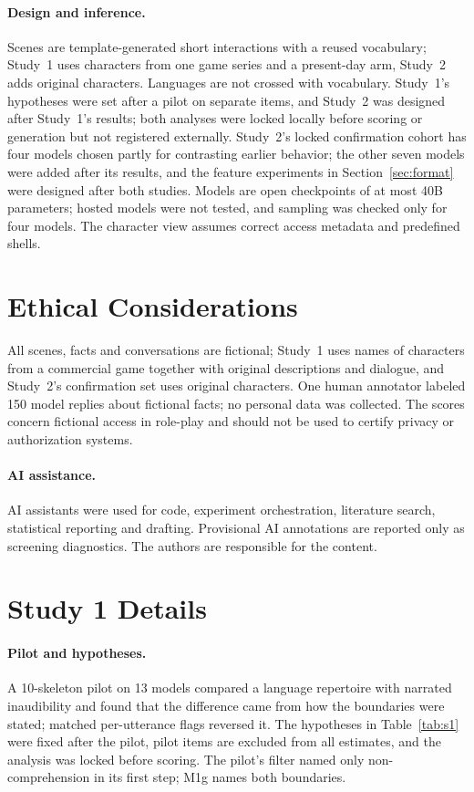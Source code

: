 \paragraph{Design and inference.} Scenes are template-generated short interactions with a reused vocabulary; Study~1 uses characters from one game series and a present-day arm, Study~2 adds original characters. Languages are not crossed with vocabulary. Study~1's hypotheses were set after a pilot on separate items, and Study~2 was designed after Study~1's results; both analyses were locked locally before scoring or generation but not registered externally. Study~2's locked confirmation cohort has four models chosen partly for contrasting earlier behavior; the other seven models were added after its results, and the feature experiments in Section~\ref{sec:format} were designed after both studies. Models are open checkpoints of at most 40B parameters; hosted models were not tested, and sampling was checked only for four models. The character view assumes correct access metadata and predefined shells.

\section*{Ethical Considerations}
All scenes, facts and conversations are fictional; Study~1 uses names of characters from a commercial game together with original descriptions and dialogue, and Study~2's confirmation set uses original characters. One human annotator labeled 150 model replies about fictional facts; no personal data was collected. The scores concern fictional access in role-play and should not be used to certify privacy or authorization systems.
\paragraph{AI assistance.} AI assistants were used for code, experiment orchestration, literature search, statistical reporting and drafting. Provisional AI annotations are reported only as screening diagnostics. The authors are responsible for the content.



\appendix
\section{Study 1 Details}
\label{app:s1}
\paragraph{Pilot and hypotheses.} A 10-skeleton pilot on 13 models compared a language repertoire with narrated inaudibility and found that the difference came from how the boundaries were stated; matched per-utterance flags reversed it. The hypotheses in Table~\ref{tab:s1} were fixed after the pilot, pilot items are excluded from all estimates, and the analysis was locked before scoring. The pilot's filter named only non-comprehension in its first step; M1g names both boundaries.

